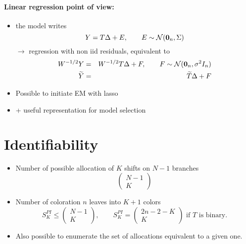 \documentclass[12pt]{article}
\newcommand{\Ncal}{\mathcal{N}}
\newcommand{\ra}{$\rightarrow$\xspace}
\begin{document}
{%
\paragraph{Linear regression point of view:}
\begin{itemize}
\item the model writes
$$
Y = T \Delta + E, \qquad E \sim \Ncal({\bf 0}_n, \Sigma)
$$
\ra regression with non iid residuals, equivalent to
\begin{eqnarray*}
W^{-1/2} Y & = & W^{-1/2} T \Delta + F, \qquad F \sim \Ncal({\bf 0}_n, \sigma^2 I_n) \\
\widetilde{Y} & = & \widetilde{T} \Delta + F
\end{eqnarray*}
\item Possible to initiate EM with lasso
\item + useful representation for model selection
\end{itemize}

\bigskip
\section{Identifiability}

\begin{itemize}
\item Number of possible allocation of $K$ shifts on $N-1$ branches 
$$
\begin{pmatrix}N-1 \\ K \end{pmatrix}
$$
\item Number of coloration $n$ leaves into $K+1$ colors
$$
S_K^{PI}  \leq \begin{pmatrix}N-1 \\ K \end{pmatrix}, \qquad S_K^{PI} = \begin{pmatrix} 2n-2-K \\ K \end{pmatrix} \text{ if $T$ is binary}.
$$
\item Also possible to enumerate the set of allocations equivalent to a given one.
\end{itemize}

\bigskip
}
\end{document}
